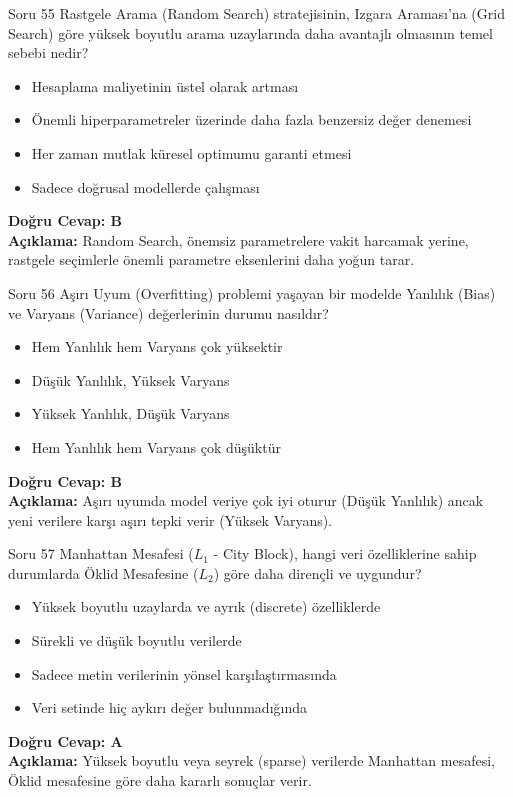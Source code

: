 \documentclass[12pt,a4paper]{article}
\begin{document}
\begin{testcard}{Soru 55}
    Rastgele Arama (Random Search) stratejisinin, Izgara Araması'na (Grid Search) göre yüksek boyutlu arama uzaylarında daha avantajlı olmasının temel sebebi nedir?
    \begin{itemize}
        \item[A)] Hesaplama maliyetinin üstel olarak artması
        \item[B)] Önemli hiperparametreler üzerinde daha fazla benzersiz değer denemesi
        \item[C)] Her zaman mutlak küresel optimumu garanti etmesi
        \item[D)] Sadece doğrusal modellerde çalışması
    \end{itemize}
    \tcblower
    \textbf{Doğru Cevap: B} \\
    \textbf{Açıklama:} Random Search, önemsiz parametrelere vakit harcamak yerine, rastgele seçimlerle önemli parametre eksenlerini daha yoğun tarar.
\end{testcard}
\begin{testcard}{Soru 56}
    Aşırı Uyum (Overfitting) problemi yaşayan bir modelde Yanlılık (Bias) ve Varyans (Variance) değerlerinin durumu nasıldır?
    \begin{itemize}
        \item[A)] Hem Yanlılık hem Varyans çok yüksektir
        \item[B)] Düşük Yanlılık, Yüksek Varyans
        \item[C)] Yüksek Yanlılık, Düşük Varyans
        \item[D)] Hem Yanlılık hem Varyans çok düşüktür
    \end{itemize}
    \tcblower
    \textbf{Doğru Cevap: B} \\
    \textbf{Açıklama:} Aşırı uyumda model veriye çok iyi oturur (Düşük Yanlılık) ancak yeni verilere karşı aşırı tepki verir (Yüksek Varyans).
\end{testcard}

\begin{testcard}{Soru 57}
    Manhattan Mesafesi ($L_1$ - City Block), hangi veri özelliklerine sahip durumlarda Öklid Mesafesine ($L_2$) göre daha dirençli ve uygundur?
    \begin{itemize}
        \item[A)] Yüksek boyutlu uzaylarda ve ayrık (discrete) özelliklerde
        \item[B)] Sürekli ve düşük boyutlu verilerde
        \item[C)] Sadece metin verilerinin yönsel karşılaştırmasında
        \item[D)] Veri setinde hiç aykırı değer bulunmadığında
    \end{itemize}
    \tcblower
    \textbf{Doğru Cevap: A} \\
    \textbf{Açıklama:} Yüksek boyutlu veya seyrek (sparse) verilerde Manhattan mesafesi, Öklid mesafesine göre daha kararlı sonuçlar verir.
\end{testcard}
\end{document}
